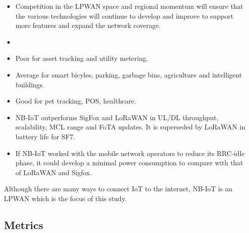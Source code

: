 \documentclass[]{article}
\begin{document}
\begin{itemize}
\item
  Competition in the LPWAN space and regional momentum will ensure that
  the various technologies will continue to develop and improve to
  support more features and expand the network coverage.
\item
\item
  Poor for asset tracking and utility metering.
\item
  Average for smart bicyles, parking, garbage bins, agriculture and
  intelligent buildings.
\item
  Good for pet tracking, POS, healthcare.
\item
  NB-IoT outperforms SigFox and LoRaWAN in UL/DL throughput,
  scalability, MCL range and FoTA updates. It is superseded by LoRaWAN
  in battery life for SF7.
\item
  If NB-IoT worked with the mobile network operators to reduce its
  RRC-idle phase, it could develop a minimal power consumption to
  compare with that of LoRaWAN and Sigfox.
\end{itemize}

Although there are many ways to connect IoT to the internet, NB-IoT is
an LPWAN which is the focus of this study.

\hypertarget{metrics_intro}{%
\subsection{Metrics}\label{metrics_intro}}
\end{document}
